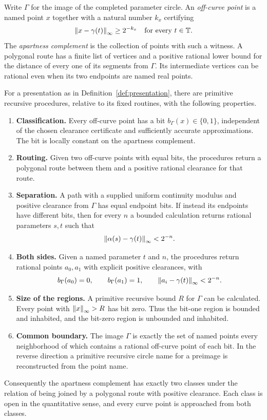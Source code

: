 Write $\Gamma$ for the image of the completed parameter circle.
An \emph{off-curve point} is a named point $x$ together with a natural
number $k_x$ certifying
\begin{equation}
 \left\lVert x-\gamma(t)\right\rVert_\infty\ge 2^{-k_x}\quad\hbox{for every }t\in\mathbb T.
 \label{eq:off}
\end{equation}
The \emph{apartness complement} is the collection of points with such a
witness. A polygonal route has a finite list of vertices and a positive
rational lower bound for the distance of every one of its segments from
$\Gamma$. Its intermediate vertices can be rational even when its two
endpoints are named real points.

\begin{theorem}\label{thm:main}
For a presentation as in Definition~\ref{def:presentation}, there are
primitive recursive procedures, relative to its fixed routines, with the
following properties.
\begin{enumerate}[label=\textnormal{(\arabic*)}]
\item \textbf{Classification.} Every off-curve point has a bit
$b_\Gamma(x)\in\{0,1\}$, independent of the chosen clearance certificate
and sufficiently accurate approximations. The bit is locally constant
on the apartness complement.
\item \textbf{Routing.} Given two off-curve points with equal bits, the
procedures return a polygonal route between them and a positive rational
clearance for that route.
\item \textbf{Separation.} A path with a supplied uniform continuity
modulus and positive clearance from $\Gamma$ has equal endpoint bits.
If instead its endpoints have different bits, then for every $n$ a
bounded calculation returns rational parameters $s,t$ such that
\[
       \left\lVert \alpha(s)-\gamma(t)\right\rVert_\infty<2^{-n}.
\]
\item \textbf{Both sides.} Given a named parameter $t$ and $n$, the
procedures return rational points $a_0,a_1$ with explicit positive
clearances, with
\[
 b_\Gamma(a_0)=0,\qquad b_\Gamma(a_1)=1,\qquad
 \left\lVert a_i-\gamma(t)\right\rVert_\infty<2^{-n}.
\]
\item \textbf{Size of the regions.} A primitive recursive bound $R$
for $\Gamma$ can be calculated. Every point with
$\left\lVert x\right\rVert_\infty>R$ has bit zero. Thus the bit-one region is bounded and
inhabited, and the bit-zero region is unbounded and inhabited.
\item \textbf{Common boundary.} The image $\Gamma$ is exactly the set
of named points every neighborhood of which contains a rational
off-curve point of each bit. In the reverse direction a primitive recursive
circle name for a preimage is reconstructed from the point name.
\end{enumerate}
Consequently the apartness complement has exactly two classes under
the relation of being joined by a polygonal route with positive
clearance. Each class is open in the quantitative sense, and every
curve point is approached from both classes.
\end{theorem}

